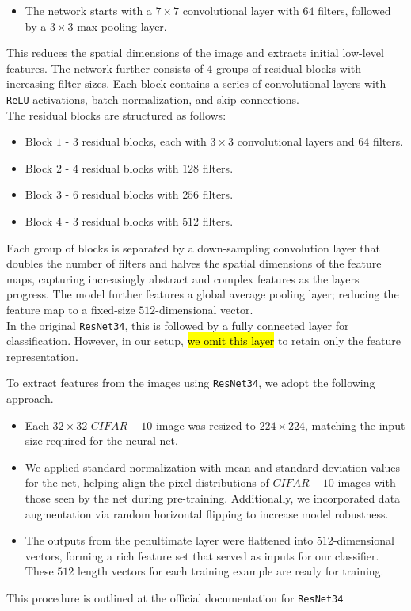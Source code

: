 \documentclass{article} %
\begin{document}
\begin{itemize}
    \item The network starts with a $7 \times 7$ convolutional layer with $64$ filters, followed by a $3 \times 3$ max pooling layer.
\end{itemize}
This reduces the spatial dimensions of the image and extracts initial low-level features. The network further consists of $4$ groups of residual blocks with increasing filter sizes. Each block contains a series of convolutional layers with \texttt{ReLU} activations, batch normalization, and skip connections. \\

The residual blocks are structured as follows:
\begin{itemize}
    \item Block $1$ - $3$ residual blocks, each with $3 \times 3$ convolutional layers and $64$ filters.
    \item Block $2$ - $4$ residual blocks with $128$ filters.
    \item Block $3$ - $6$ residual blocks with $256$ filters.
    \item Block $4$ - $3$ residual blocks with $512$ filters.
\end{itemize}
Each group of blocks is separated by a down-sampling convolution layer that doubles the number of filters and halves the spatial dimensions of the feature maps, capturing increasingly abstract and complex features as the layers progress. The model further features a global average pooling layer; reducing the feature map to a fixed-size $512$-dimensional vector. \\

In the original \texttt{ResNet34}, this is followed by a fully connected layer for classification. However, in our setup, \hl{we omit this layer} to retain only the feature representation.

To extract features from the images using \texttt{ResNet34}, we adopt the following approach.
\begin{itemize}
    \item Each $32 \times 32$ $CIFAR-10$ image was resized to $224 \times 224$, matching the input size required for the neural net.
    \item We applied standard normalization with mean and standard deviation values for the net, helping align the pixel distributions of $CIFAR-10$ images with those seen by the net during pre-training. Additionally, we incorporated data augmentation via random horizontal flipping to increase model robustness.
    \item The outputs from the penultimate layer were flattened into $512$-dimensional vectors, forming a rich feature set that served as inputs for our classifier. These $512$ length vectors for each training example are ready for training.
\end{itemize}
This procedure is outlined at the official documentation for \texttt{ResNet34} \cite{resnet34_docs}
\end{document}
